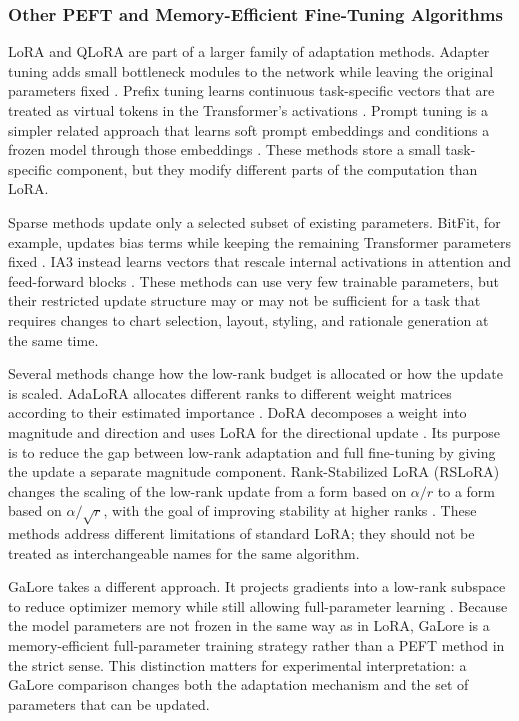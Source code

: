 \iffalse
\subsubsection{Other PEFT and Memory-Efficient Fine-Tuning Algorithms}

LoRA and QLoRA are part of a larger family of adaptation methods. Adapter tuning adds small bottleneck modules to the network while leaving the original parameters fixed \cite{houlsby2019adapter}. Prefix tuning learns continuous task-specific vectors that are treated as virtual tokens in the Transformer's activations \cite{li2021prefixtuning}. Prompt tuning is a simpler related approach that learns soft prompt embeddings and conditions a frozen model through those embeddings \cite{lester2021prompttuning}. These methods store a small task-specific component, but they modify different parts of the computation than LoRA.

Sparse methods update only a selected subset of existing parameters. BitFit, for example, updates bias terms while keeping the remaining Transformer parameters fixed \cite{benzaken2022bitfit}. IA3 instead learns vectors that rescale internal activations in attention and feed-forward blocks \cite{liu2022ia3}. These methods can use very few trainable parameters, but their restricted update structure may or may not be sufficient for a task that requires changes to chart selection, layout, styling, and rationale generation at the same time.

Several methods change how the low-rank budget is allocated or how the update is scaled. AdaLoRA allocates different ranks to different weight matrices according to their estimated importance \cite{zhang2023adalora}. DoRA decomposes a weight into magnitude and direction and uses LoRA for the directional update \cite{liu2024dora}. Its purpose is to reduce the gap between low-rank adaptation and full fine-tuning by giving the update a separate magnitude component. Rank-Stabilized LoRA (RSLoRA) changes the scaling of the low-rank update from a form based on \(\alpha/r\) to a form based on \(\alpha/\sqrt{r}\), with the goal of improving stability at higher ranks \cite{kalajdzievski2023rslora}. These methods address different limitations of standard LoRA; they should not be treated as interchangeable names for the same algorithm.

GaLore takes a different approach. It projects gradients into a low-rank subspace to reduce optimizer memory while still allowing full-parameter learning \cite{zhao2024galore}. Because the model parameters are not frozen in the same way as in LoRA, GaLore is a memory-efficient full-parameter training strategy rather than a PEFT method in the strict sense. This distinction matters for experimental interpretation: a GaLore comparison changes both the adaptation mechanism and the set of parameters that can be updated.

